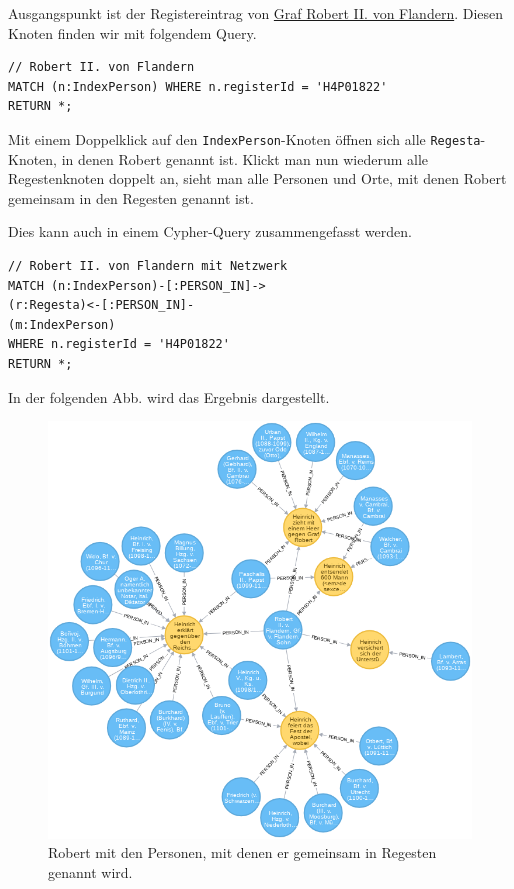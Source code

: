 \documentclass[ngerman,]{scrreprt}
\begin{document}
Ausgangspunkt ist der Registereintrag von \href{https://de.wikipedia.org/wiki/Robert_II._(Flandern)}{Graf Robert II. von Flandern}. Diesen Knoten finden wir mit folgendem Query.

\begin{verbatim}
// Robert II. von Flandern
MATCH (n:IndexPerson) WHERE n.registerId = 'H4P01822'
RETURN *;
\end{verbatim}

Mit einem Doppelklick auf den \texttt{IndexPerson}-Knoten öffnen sich alle \texttt{Regesta}-Knoten, in denen Robert genannt ist. Klickt man nun wiederum alle Regestenknoten doppelt an, sieht man alle Personen und Orte, mit denen Robert gemeinsam in den Regesten genannt ist.

Dies kann auch in einem Cypher-Query zusammengefasst werden.

\begin{verbatim}
// Robert II. von Flandern mit Netzwerk
MATCH (n:IndexPerson)-[:PERSON_IN]->
(r:Regesta)<-[:PERSON_IN]-
(m:IndexPerson)
WHERE n.registerId = 'H4P01822'
RETURN *;
\end{verbatim}

In der folgenden Abb. wird das Ergebnis dargestellt.

\begin{figure}
\centering
\includegraphics{Bilder/RI2Graph/RobertVonFlandernMitRegesten.png}
\caption{Robert mit den Personen, mit denen er gemeinsam in Regesten genannt wird.}
\end{figure}
\end{document}
